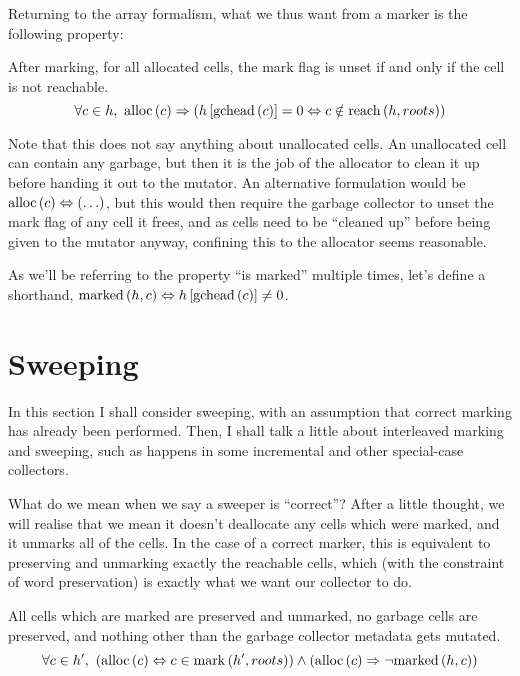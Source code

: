 Returning to the array formalism, what we thus want from a marker is
the following property:

\begin{definition}
  \label{def:ms-correct-marking}
  After marking, for all allocated \glspl{cell}, the mark flag is
  unset if and only if the \gls{cell} is not reachable.
  \[\forall c \in h,\ \mathrm{alloc}\left(c\right) \Rightarrow
  \left(h\left[\mathrm{gchead}\left(c\right)\right] = 0 \Leftrightarrow c \notin
    \mathrm{reach}\left(h, roots\right)\right)\]
\end{definition}

Note that this does not say anything about unallocated
\glspl{cell}. An unallocated \gls{cell} can contain any garbage, but
then it is the job of the allocator to clean it up before handing it
out to the \gls{mutator}. An alternative formulation would be
$\mathrm{alloc}\left(c\right) \Leftrightarrow \left(\ldots\right)$, but this would then require the
\gls{garbage collector} to unset the mark flag of any \gls{cell} it
frees, and as \glspl{cell} need to be ``cleaned up'' before being
given to the \gls{mutator} anyway, confining this to the allocator
seems reasonable.

As we'll be referring to the property ``is marked'' multiple times,
let's define a shorthand, $\mathrm{marked}\left(h, c\right) \Leftrightarrow h\left[\mathrm{gchead}\left(c\right)\right]
\neq 0$.

\section{Sweeping}
\label{sec:marksweep-sweeping}

In this section I shall consider sweeping, with an assumption that
correct marking has already been performed. Then, I shall talk a
little about interleaved marking and sweeping, such as happens in some
incremental and other special-case collectors.

What do we mean when we say a sweeper is ``correct''? After a little
thought, we will realise that we mean it doesn't deallocate any
\glspl{cell} which were marked, and it unmarks all of the
\glspl{cell}. In the case of a correct marker, this is equivalent to
preserving and unmarking exactly the reachable \glspl{cell}, which
(with the constraint of word preservation) is exactly what we want our
\gls{collector} to do.

\begin{definition}
  \label{def:ms-correct-sweeping}
  All cells which are marked are preserved and unmarked, no garbage
  cells are preserved, and nothing other than the garbage collector
  metadata gets mutated.
  \[\forall c \in h',\ \left(\mathrm{alloc}\left(c\right) \Leftrightarrow c \in
    \mathrm{mark}\left(h', roots\right)\right) \land \left(\mathrm{alloc}\left(c\right) \Rightarrow
    \lnot\mathrm{marked}\left(h, c\right)\right)\]
\end{definition}


